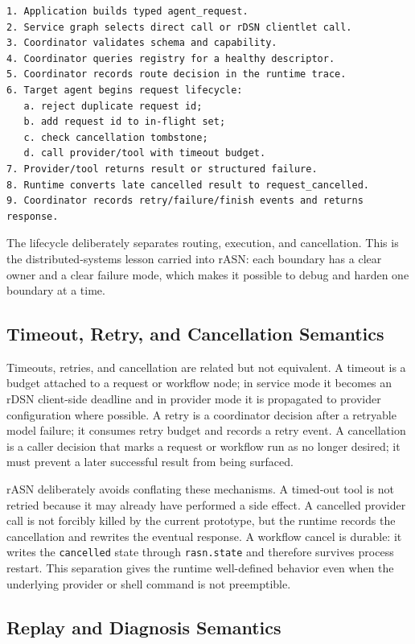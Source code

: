 \documentclass[manuscript,screen,review]{acmart}
\newcommand{\rasn}{rASN\xspace}
\newcommand{\rdsn}{rDSN\xspace}
\begin{document}
\begin{lstlisting}
1. Application builds typed agent_request.
2. Service graph selects direct call or rDSN clientlet call.
3. Coordinator validates schema and capability.
4. Coordinator queries registry for a healthy descriptor.
5. Coordinator records route decision in the runtime trace.
6. Target agent begins request lifecycle:
   a. reject duplicate request id;
   b. add request id to in-flight set;
   c. check cancellation tombstone;
   d. call provider/tool with timeout budget.
7. Provider/tool returns result or structured failure.
8. Runtime converts late cancelled result to request_cancelled.
9. Coordinator records retry/failure/finish events and returns response.
\end{lstlisting}

The lifecycle deliberately separates routing, execution, and cancellation. This
is the distributed-systems lesson carried into \rasn: each boundary has a clear
owner and a clear failure mode, which makes it possible to debug and harden one
boundary at a time.

\subsection{Timeout, Retry, and Cancellation Semantics}

Timeouts, retries, and cancellation are related but not equivalent. A timeout is
a budget attached to a request or workflow node; in service mode it becomes an
\rdsn client-side deadline and in provider mode it is propagated to provider
configuration where possible. A retry is a coordinator decision after a
retryable model failure; it consumes retry budget and records a retry event. A
cancellation is a caller decision that marks a request or workflow run as no
longer desired; it must prevent a later successful result from being surfaced.

\rasn deliberately avoids conflating these mechanisms. A timed-out tool is not
retried because it may already have performed a side effect. A cancelled
provider call is not forcibly killed by the current prototype, but the runtime
records the cancellation and rewrites the eventual response. A workflow cancel
is durable: it writes the \texttt{cancelled} state through \texttt{rasn.state}
and therefore survives process restart. This separation gives the runtime
well-defined behavior even when the underlying provider or shell command is not
preemptible.

\subsection{Replay and Diagnosis Semantics}
\end{document}
